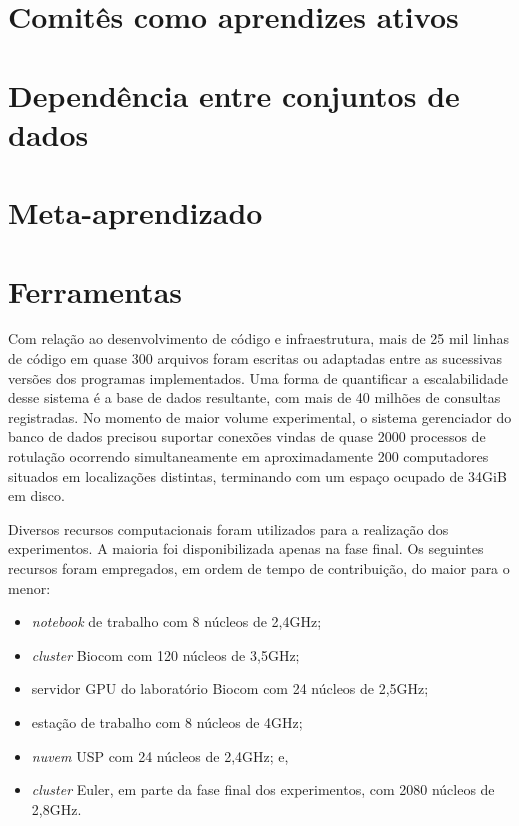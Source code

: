 \documentclass[doutorado, pos-defesa, spanish, english, brazil, versalete, sumario=tradicional]{packages/icmc}
\begin{document}
\begin{apendicesenv}

\chapter{Comitês como aprendizes ativos}\label{apexpcom}


\chapter{Dependência entre conjuntos de dados}\label{apflu}


\chapter{Meta-aprendizado} \label{apmeta}


\chapter{Ferramentas}\label{apfer}
Com relação ao desenvolvimento de código e infraestrutura, mais de 25 mil linhas de código em quase 300 arquivos foram escritas ou adaptadas entre as sucessivas versões dos programas implementados.
Uma forma de quantificar a escalabilidade desse sistema é a base de dados resultante, com mais de 40 milhões de consultas registradas.
No momento de maior volume experimental, o sistema gerenciador do banco de dados precisou suportar conexões vindas de quase 2000 processos de rotulação ocorrendo simultaneamente em aproximadamente 200 computadores situados em localizações distintas, terminando com um espaço ocupado de 34GiB em disco.

Diversos recursos computacionais foram utilizados para a realização dos experimentos.
A maioria foi disponibilizada apenas na fase final.
Os seguintes recursos foram empregados, em ordem de tempo de contribuição, do maior para o menor:
\begin{itemize}
\item \textit{notebook} de trabalho com 8 núcleos de 2,4GHz;
\item \textit{cluster} Biocom com 120 núcleos de 3,5GHz;
\item servidor GPU do laboratório Biocom com 24 núcleos de 2,5GHz;
\item estação de trabalho
com 8 núcleos de 4GHz;
\item \textit{nuvem} USP com 24 núcleos de 2,4GHz; e,
\item \textit{cluster} Euler, em parte da fase final dos experimentos, com 2080 núcleos de 2,8GHz.
\end{itemize}


\end{apendicesenv}
\end{document}
